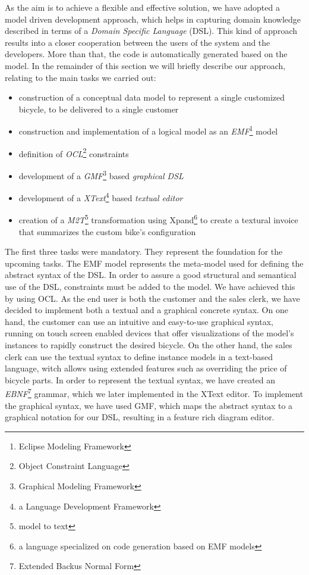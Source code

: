 \noindent As the aim is to achieve a flexible and effective solution, we have
adopted a model driven development approach, which helps in capturing domain
knowledge described in terms of a \emph{Domain Specific Language} (DSL). This
kind of approach results into a closer cooperation between the users of the
system and the developers. More than that, the code is automatically generated
based on the model. In the remainder of this section we will briefly describe
our approach, relating to the main tasks we carried out:
\begin{itemize}
  \item construction of a conceptual data model to represent a single customized
  bicycle, to be delivered to a single customer
  \item construction and implementation of a logical model as an
  \emph{EMF}\footnote{Eclipse Modeling Framework} model
  \item definition of \emph{OCL}\footnote{Object Constraint Language}
  constraints
  \item development of a \emph{GMF}\footnote{Graphical Modeling Framework} based
  \emph{graphical DSL}
  \item development of a \emph{XText}\footnote{a Language Development Framework}
  based \emph{textual editor}
  \item creation of a \emph{M2T}\footnote{model to text} transformation using
  Xpand\footnote{a language specialized on code generation based on EMF models}
  to create a textural invoice that summarizes the custom bike's configuration
\end{itemize} 

\noindent The first three tasks were mandatory. They represent the foundation
for the upcoming tasks. The EMF model represents the meta-model used for
defining the abstract syntax of the DSL. In order to assure a good structural
and semantical use of the DSL, constraints must be added to the model. We have
achieved this by using OCL. As the end user is both the customer and the sales
clerk, we have decided to implement both a textual and a graphical concrete syntax. On
one hand, the customer can use an intuitive and easy-to-use graphical
syntax, running on touch screen enabled devices that offer visualizations
of the model's instances to rapidly construct the desired bicycle. On the other
hand, the sales clerk can use the textual syntax to define instance models in a
text-based language, witch allows using extended features such as overriding
the price of bicycle parts. In order to represent the textual syntax, we have
created an \emph{EBNF}\footnote{Extended Backus Normal Form} grammar, which we later 
implemented in the XText editor. To implement the graphical syntax, we have used GMF, 
which maps the abstract syntax to a graphical notation for our DSL, resulting in
a feature rich diagram editor.\\

